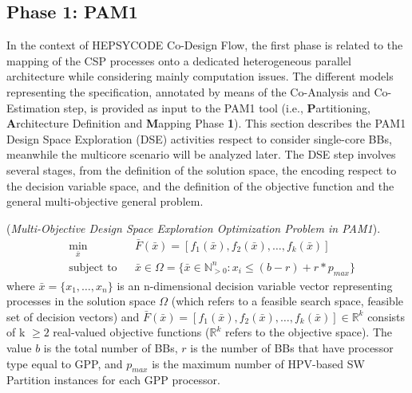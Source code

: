 \subsection{Phase 1: PAM1}
In the context of HEPSYCODE Co-Design Flow, the first phase is related to the mapping of the CSP processes onto a dedicated heterogeneous parallel architecture while considering mainly computation issues. The different models representing the specification, annotated by means of the Co-Analysis and Co-Estimation step, is provided as input to the PAM1 tool (i.e., \textbf{P}artitioning, \textbf{A}rchitecture Definition and \textbf{M}apping Phase \textbf{1}). This section describes the PAM1 Design Space Exploration (DSE) activities respect to consider single-core BBs, meanwhile the multicore scenario will be analyzed later. The DSE step involves several stages, from the definition of the solution space, the encoding respect to the decision variable space, and the definition of the objective function and the general multi-objective general problem.
%
\theoremstyle{definition}
\begin{definition}{(\textit{Multi-Objective Design Space Exploration Optimization Problem in PAM1}).}
%
\begin{equation} \label{equation128}
  \begin{aligned}
    & \underset{\bar x}{\text{min}} &  & \bar F(\bar x) = [f_1(\bar x), f_2(\bar x), \ldots , f_k(\bar x)] \\
    & \text{subject to}             &  & \bar x \in \Omega = \{ \bar x  \in \mathbb{N}_{> 0}^{n} : x_i \leq (b - r) + r * p_{max} \}
\end{aligned}
\end{equation}
%
where $\bar x = \{x_1,\ldots, x_n\}$ is an n-dimensional decision variable vector representing processes in the solution space $\Omega$ (which refers to a feasible search space, feasible set of decision vectors) and $\bar F(\bar x) = [f_1(\bar x), f_2(\bar x), \ldots , f_k(\bar x)] \in \mathbb{R}^k$ consists of k $\geq 2$ real-valued objective functions ($\mathbb{R}^k$ refers to the objective space). The value $b$ is the total number of BBs, $r$ is the number of BBs that have processor type equal to GPP, and $p_{max}$ is the maximum number of HPV-based SW Partition instances for each GPP processor. \par
%
\end{definition}
%
